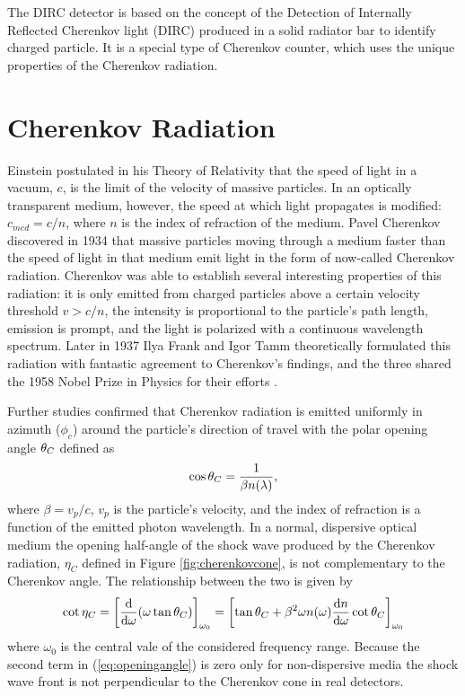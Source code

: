 The DIRC detector is based on the concept of the Detection of Internally Reflected Cherenkov light (DIRC) produced in a solid radiator bar to identify charged particle. It is a special type of Cherenkov counter, which uses the unique properties of the Cherenkov radiation.

\section{Cherenkov Radiation}
Einstein postulated in his Theory of Relativity that the speed of light in a vacuum, $c$, is the limit of the velocity of massive particles. In an optically transparent medium, however, the speed at which light propagates is modified: $c_{med} = c/n$, where $n$ is the index of refraction of the medium. Pavel Cherenkov discovered in 1934 that massive particles moving through a medium faster than the speed of light in that medium emit light in the form of now-called Cherenkov radiation. Cherenkov was able to establish several interesting properties of this radiation: it is only emitted from charged particles above a certain velocity threshold $v > c/n$, the intensity is proportional to the particle's path length, emission is prompt, and the light is polarized with a continuous wavelength spectrum. Later in 1937 Ilya Frank and Igor Tamm theoretically formulated this radiation with fantastic agreement to Cherenkov's findings, and the three shared the 1958 Nobel Prize in Physics for their efforts \cite{CherenkovHistory}.

Further studies confirmed that Cherenkov radiation is emitted uniformly in azimuth ($\phi_c$) around the particle's direction of travel with the polar opening angle $\theta_{C}$ defined as
\begin{equation}
	\cos\theta_{C} = \frac{1}{\beta n(\lambda)},
	\label{eq:cherenkovformula}
\end{equation}
where $\beta = v_p/c$, $v_p$ is the particle's velocity, and the index of refraction is a function of the emitted photon wavelength. In a normal, dispersive optical medium the opening half-angle of the shock wave produced by the Cherenkov radiation, $\eta_C$ defined in Figure \ref{fig:cherenkovcone}, is not complementary to the Cherenkov angle. The relationship between the two is given by
\begin{equation}
	\cot\eta_C = \left[\frac{\mathrm{d}}{\mathrm{d}\omega}(\omega \tan\theta_{C}) \right]_{\omega_0} = \left[\tan\theta_{C} + \beta^2\omega n(\omega) \frac{\mathrm{d} n}{\mathrm{d}\omega}\cot\theta_{C} \right]_{\omega_0}
	\label{eq:openingangle}
\end{equation}
where $\omega_0$ is the central vale of the considered frequency range. Because the second term in (\ref{eq:openingangle}) is zero only for non-dispersive media the shock wave front is not perpendicular to the Cherenkov cone in real detectors.

